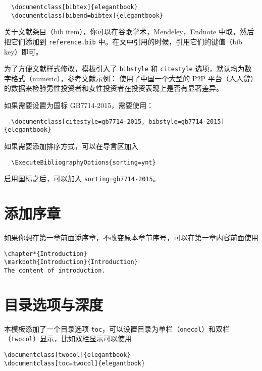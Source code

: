 \begin{lstlisting}
  \documentclass[bibtex]{elegantbook}
  \documentclass[bibend=bibtex]{elegantbook}
\end{lstlisting}

关于文献条目（bib item），你可以在谷歌学术，Mendeley，Endnote 中取，然后把它们添加到 \lstinline{reference.bib} 中。在文中引用的时候，引用它们的键值（bib key）即可。

为了方便文献样式修改，模板引入了 \lstinline{bibstyle} 和 \lstinline{citestyle} 选项，默认均为数字格式（numeric），参考文献示例：\cite{cn1,en2,en3} 使用了中国一个大型的 P2P 平台（人人贷）的数据来检验男性投资者和女性投资者在投资表现上是否有显著差异。

如果需要设置为国标 GB7714-2015，需要使用：
\begin{lstlisting}
  \documentclass[citestyle=gb7714-2015, bibstyle=gb7714-2015]{elegantbook} 
\end{lstlisting}

如果需要添加排序方式，可以在导言区加入
\begin{lstlisting}
  \ExecuteBibliographyOptions{sorting=ynt}
\end{lstlisting}

启用国标之后，可以加入 \lstinline{sorting=gb7714-2015}。

\section{添加序章}

如果你想在第一章前面添序章，不改变原本章节序号，可以在第一章内容前面使用 
\begin{lstlisting}
\chapter*{Introduction}
\markboth{Introduction}{Introduction}
The content of introduction.
\end{lstlisting}

\section{目录选项与深度}
本模板添加了一个目录选项 \lstinline{toc}，可以设置目录为单栏（\lstinline{onecol}）和双栏（\lstinline{twocol}）显示，比如双栏显示可以使用
\begin{lstlisting}
\documentclass[twocol]{elegantbook}
\documentclass[toc=twocol]{elegantbook}
\end{lstlisting}

